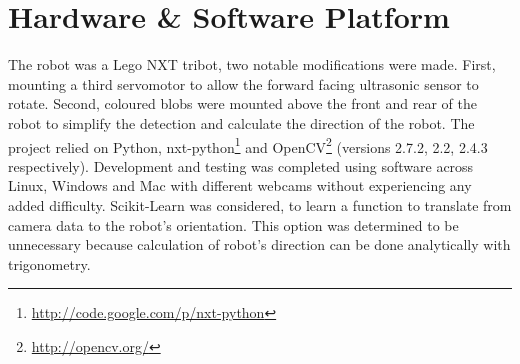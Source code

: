 \section{Hardware \& Software Platform}
\label{section::platform}

The robot was a Lego NXT tribot, two notable modifications were made.  First, mounting a third servomotor to allow the forward facing ultrasonic sensor to rotate. Second, coloured blobs were mounted above the front and rear of the robot to simplify the detection and calculate the direction of the robot. The project relied on Python, nxt-python\footnote{\url{http://code.google.com/p/nxt-python}}  and OpenCV\footnote{\url{http://opencv.org/}}  (versions 2.7.2, 2.2, 2.4.3 respectively). Development and testing was completed using software across Linux, Windows and Mac with different webcams without experiencing any added difficulty. Scikit-Learn was considered, to learn a function to translate from camera data to the robot's orientation.  This option was determined to be unnecessary because calculation of robot’s direction can be done analytically with trigonometry.